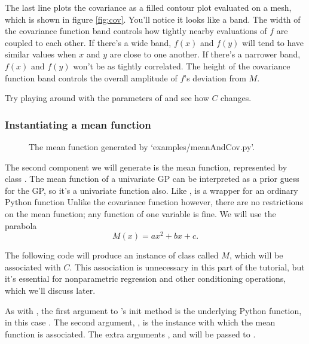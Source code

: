 \documentclass{manual}
\begin{document}
The last line plots the covariance as a filled contour plot evaluated on a mesh, which is shown in figure \ref{fig:cov}. You'll notice it looks like a band. The width of the covariance function band controls how tightly nearby evaluations of $f$ are coupled to each other. If there's a wide band, $f(x)$ and $f(y)$ will tend to have similar values when $x$ and $y$ are close to one another. If there's a narrower band, $f(x)$ and $f(y)$ won't be as tightly correlated. The height of the covariance function band controls the overall amplitude of $f$'s deviation from $M$. 

Try playing around with the parameters of  and see how $C$ changes.

\subsubsection{Instantiating a mean function}\label{subsub:mean}

\begin{figure}
	\centering
	\caption{The mean function generated by {\sffamily `examples/meanAndCov.py'}.}
	\label{fig:mean}
\end{figure}

The second component we will generate is the mean function, represented by class . The mean function of a univariate GP can be interpreted as a prior guess for the GP, so it's a univariate function also. Like ,  is a wrapper for an ordinary Python function Unlike the covariance function however, there are no restrictions on the mean function; any function of one variable is fine. We will use the parabola
\begin{equation}
	M(x) = ax^2 + bx + c.
\end{equation}

The following code will produce an instance of class  called $M$, which will be associated with $C$. This association is unnecessary in this part of the tutorial, but it's essential for nonparametric regression and other conditioning operations, which we'll discuss later.


As with , the first argument to 's init method is the underlying Python function, in this case . The second argument, , is the  instance with which the mean function is associated. The extra arguments ,   and  will be passed to .
\end{document}

